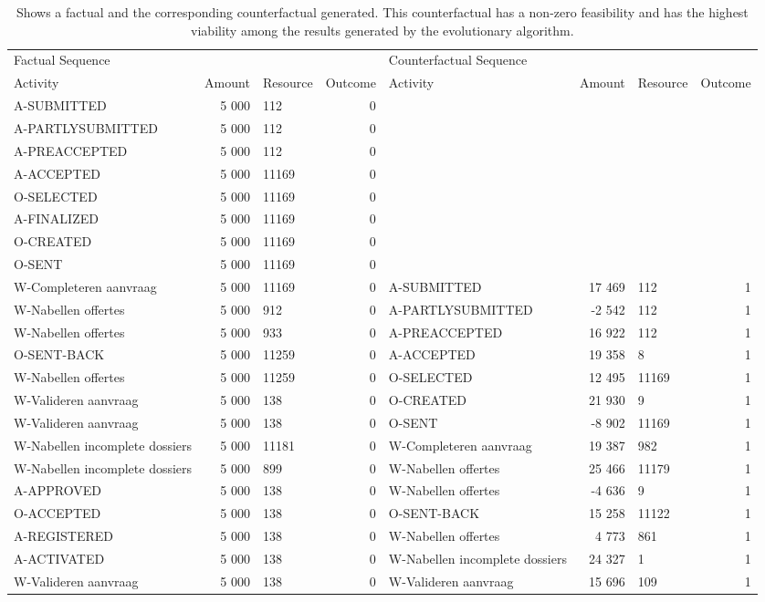 \begin{table}
\caption{Shows a factual and the corresponding counterfactual generated. This counterfactual has a non-zero feasibility and has the highest viability among the results generated by the evolutionary algorithm.}
\label{tbl:example-cf-evo-feasibility}
\begin{tabular}{lrlrlrlr}
\toprule
\multicolumn{4}{l}{Factual Sequence} & \multicolumn{4}{l}{Counterfactual Sequence} \\
Activity & Amount & Resource & Outcome & Activity & Amount & Resource & Outcome \\
\midrule
A-SUBMITTED & 5 000 & 112 & 0 &  &  &  &  \\
A-PARTLYSUBMITTED & 5 000 & 112 & 0 &  &  &  &  \\
A-PREACCEPTED & 5 000 & 112 & 0 &  &  &  &  \\
A-ACCEPTED & 5 000 & 11169 & 0 &  &  &  &  \\
O-SELECTED & 5 000 & 11169 & 0 &  &  &  &  \\
A-FINALIZED & 5 000 & 11169 & 0 &  &  &  &  \\
O-CREATED & 5 000 & 11169 & 0 &  &  &  &  \\
O-SENT & 5 000 & 11169 & 0 &  &  &  &  \\
W-Completeren aanvraag & 5 000 & 11169 & 0 & A-SUBMITTED & 17 469 & 112 & 1 \\
W-Nabellen offertes & 5 000 & 912 & 0 & A-PARTLYSUBMITTED & -2 542 & 112 & 1 \\
W-Nabellen offertes & 5 000 & 933 & 0 & A-PREACCEPTED & 16 922 & 112 & 1 \\
O-SENT-BACK & 5 000 & 11259 & 0 & A-ACCEPTED & 19 358 & 8 & 1 \\
W-Nabellen offertes & 5 000 & 11259 & 0 & O-SELECTED & 12 495 & 11169 & 1 \\
W-Valideren aanvraag & 5 000 & 138 & 0 & O-CREATED & 21 930 & 9 & 1 \\
W-Valideren aanvraag & 5 000 & 138 & 0 & O-SENT & -8 902 & 11169 & 1 \\
W-Nabellen incomplete dossiers & 5 000 & 11181 & 0 & W-Completeren aanvraag & 19 387 & 982 & 1 \\
W-Nabellen incomplete dossiers & 5 000 & 899 & 0 & W-Nabellen offertes & 25 466 & 11179 & 1 \\
A-APPROVED & 5 000 & 138 & 0 & W-Nabellen offertes & -4 636 & 9 & 1 \\
O-ACCEPTED & 5 000 & 138 & 0 & O-SENT-BACK & 15 258 & 11122 & 1 \\
A-REGISTERED & 5 000 & 138 & 0 & W-Nabellen offertes & 4 773 & 861 & 1 \\
A-ACTIVATED & 5 000 & 138 & 0 & W-Nabellen incomplete dossiers & 24 327 & 1 & 1 \\
W-Valideren aanvraag & 5 000 & 138 & 0 & W-Valideren aanvraag & 15 696 & 109 & 1 \\
\bottomrule
\end{tabular}
\end{table}
